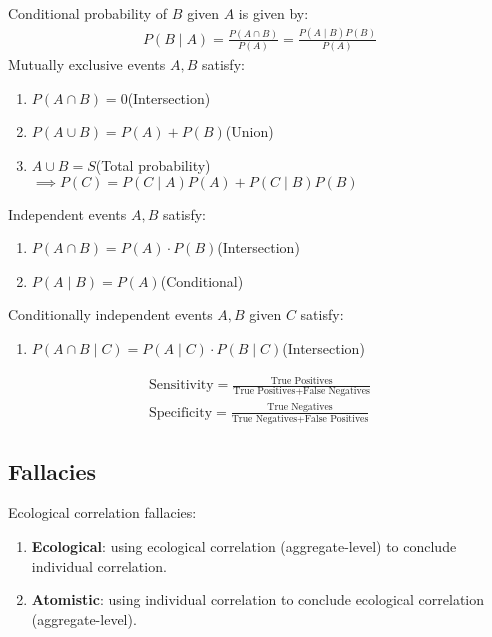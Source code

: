 \documentclass[12pt, a4paper]{article}
\begin{document}
\begin{multicols*}{3}
Conditional probability of $B$ given $A$ is given by:
\begin{align*}
  P(B\mid A) = \displaystyle\frac{P(A\cap B)}{P(A)} = \frac{P(A\mid B)P(B)}{P(A)}
\end{align*}
Mutually exclusive events $A,B$ satisfy:
\begin{enumerate}[\roman*.]
  \item $P(A\cap B) = 0$\hfill(Intersection)
  \item $P(A\cup B) = P(A) + P(B)$\hfill(Union)
  \item $A \cup B = S$\hfill(Total probability)\\$\implies P(C) = P(C\mid A)P(A) + P(C\mid B)P(B)$
\end{enumerate}

Independent events $A,B$ satisfy:
\begin{enumerate}[\roman*.]
  \item $P(A\cap B) = P(A)\cdot P(B)$\hfill(Intersection)
  \item $P(A\mid B) = P(A)$\hfill(Conditional)
\end{enumerate}

Conditionally independent events $A,B$ given $C$ satisfy:
\begin{enumerate}[\roman*.]
  \item $P(A\cap B\mid C) = P(A\mid C)\cdot P(B\mid C)$\hfill(Intersection)
\end{enumerate}
\begin{align*}
  \text{Sensitivity} = \frac{\text{True Positives}}{\text{True Positives} + \text{False Negatives}}\\
  \text{Specificity} = \frac{\text{True Negatives}}{\text{True Negatives} + \text{False Positives}}
\end{align*}
\subsection{Fallacies}
Ecological correlation fallacies:
\begin{enumerate}[\roman*.]
  \item \textbf{Ecological}: using ecological correlation (aggregate-level) to conclude individual correlation. 
  \item \textbf{Atomistic}: using individual correlation to conclude ecological correlation (aggregate-level). 
\end{enumerate}


\end{multicols*}
\end{document}
